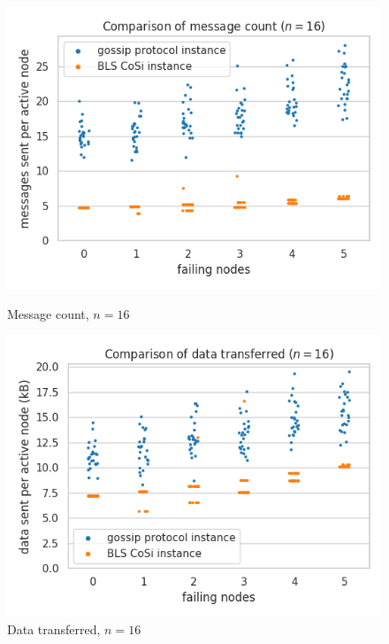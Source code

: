 \begin{figure}[H]
    \centering
    \begin{minipage}{0.5\textwidth}
        \centering
        \includegraphics[width=\textwidth]{figures/1/bandwidth_msg_tx_sum_16.png}
        \captionsetup{labelformat=empty}
        \caption{Message count, $n = 16$}
    \end{minipage}\hfill
    \begin{minipage}{0.5\textwidth}
        \centering
        \includegraphics[width=\textwidth]{figures/1/bandwidth_tx_sum_16.png}
        \captionsetup{labelformat=empty}
        \caption{Data transferred, $n = 16$}
    \end{minipage}\hfill
\end{figure}

